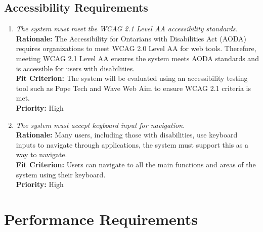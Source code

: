 \documentclass[12pt]{article}
\begin{document}
\subsection{Accessibility Requirements}
\begin{enumerate}[label=UHR-AR \arabic*., wide=0pt, leftmargin=*]
  \item \emph{The system must meet the WCAG 2.1 Level AA
    accessibility standards.}\\[2mm]
    {\bf Rationale:} The Accessibility for Ontarians with
    Disabilities Act (AODA) requires organizations to meet WCAG 2.0
    Level AA for web tools. Therefore, meeting WCAG 2.1 Level AA
    ensures the system meets AODA standards and is accessible for
    users with disabilities.  \\
    {\bf Fit Criterion:} The system will be evaluated using an
    accessibility testing tool such as Pope Tech and Wave Web Aim to
    ensure WCAG 2.1 criteria is met.\\
    {\bf Priority:} High
  \item \emph{The system must accept keyboard input for navigation.}\\[2mm]
    {\bf Rationale:} Many users, including those with disabilities,
    use keyboard inputs to navigate through applications, the system
    must support this as a way to navigate.\\
    {\bf Fit Criterion:} Users can navigate to all the main functions
    and areas of the system using their keyboard. \\
    {\bf Priority:} High
\end{enumerate}

\section{Performance Requirements}
\end{document}
